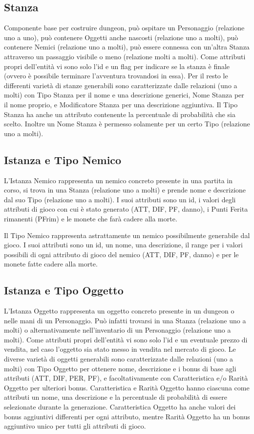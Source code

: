 \documentclass[10pt,a4paper]{article}
\begin{document}
\subsection{Stanza}
Componente base per costruire dungeon, può ospitare un Personaggio (relazione uno a uno), può contenere Oggetti anche nascosti (relazione uno a molti), può contenere Nemici (relazione uno a molti), può essere connessa con un'altra Stanza attraverso un passaggio visibile o meno (relazione molti a molti). Come attributi propri dell'entità vi sono solo l'id e un flag per indicare se la stanza è finale (ovvero è possibile terminare l'avventura trovandosi in essa). Per il resto le differenti varietà di stanze generabili sono caratterizzate dalle relazioni (uno a molti) con Tipo Stanza per il nome e una descrizione generici, Nome Stanza per il nome proprio, e Modificatore Stanza per una descrizione aggiuntiva. Il Tipo Stanza ha anche un attributo contenente la percentuale di probabilità che sia scelto. Inoltre un Nome Stanza è permesso solamente per un certo Tipo (relazione uno a molti).

\subsection{Istanza e Tipo Nemico}
L'Istanza Nemico rappresenta un nemico concreto presente in una partita in corso, si trova in una Stanza (relazione uno a molti) e prende nome e descrizione dal suo Tipo (relazione uno a molti). I suoi attributi sono un id, i valori degli attributi di gioco con cui è stato generato (ATT, DIF, PF, danno), i Punti Ferita rimanenti (PFrim) e le monete che farà cadere alla morte.

Il Tipo Nemico rappresenta astrattamente un nemico possibilmente generabile dal gioco. I suoi attributi sono un id, un nome, una descrizione, il range per i valori possibili di ogni attributo di gioco del nemico (ATT, DIF, PF, danno) e per le monete fatte cadere alla morte.

\subsection{Istanza e Tipo Oggetto}
L'Istanza Oggetto rappresenta un oggetto concreto presente in un dungeon o nelle mani di un Personaggio. Può infatti trovarsi in una Stanza (relazione uno a molti) o alternativamente nell'inventario di un Personaggio (relazione uno a molti). Come attributi propri dell'entità vi sono solo l'id e un eventuale prezzo di vendita, nel caso l'oggetto sia stato messo in vendita nel mercato di gioco. Le diverse varietà di oggetti generabili sono caratterizzate dalle relazioni (uno a molti) con Tipo Oggetto per ottenere nome, descrizione e i bonus di base agli attributi (ATT, DIF, PER, PF), e facoltativamente con Caratteristica e/o Rarità Oggetto per ulteriori bonus. Caratteristica e Rarità Oggetto hanno ciascuna come attributi un nome, una descrizione e la percentuale di probabilità di essere selezionate durante la generazione. Caratteristica Oggetto ha anche valori dei bonus aggiuntivi differenti per ogni attributo, mentre Rarità Oggetto ha un bonus aggiuntivo unico per tutti gli attributi di gioco.
\end{document}
